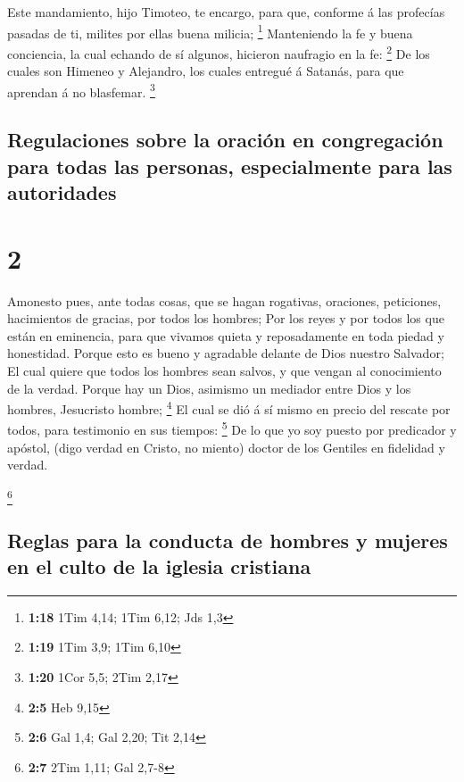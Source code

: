  Este mandamiento, hijo Timoteo, te encargo, para que,
conforme á las profecías pasadas de ti, milites por ellas buena milicia;
\footnote{\textbf{1:18} 1Tim 4,14; 1Tim 6,12; Jds 1,3} 
Manteniendo la fe y buena conciencia, la cual echando de sí algunos,
hicieron naufragio en la fe: \footnote{\textbf{1:19} 1Tim 3,9; 1Tim 6,10}
 De los cuales son Himeneo y Alejandro, los cuales entregué
á Satanás, para que aprendan á no blasfemar. \footnote{\textbf{1:20}
  1Cor 5,5; 2Tim 2,17}

\hypertarget{regulaciones-sobre-la-oraciuxf3n-en-congregaciuxf3n-para-todas-las-personas-especialmente-para-las-autoridades}{%
\subsection{Regulaciones sobre la oración en congregación para todas las
personas, especialmente para las
autoridades}\label{regulaciones-sobre-la-oraciuxf3n-en-congregaciuxf3n-para-todas-las-personas-especialmente-para-las-autoridades}}

\hypertarget{section-1}{%
\section{2}\label{section-1}}

 Amonesto pues, ante todas cosas, que se hagan rogativas,
oraciones, peticiones, hacimientos de gracias, por todos los hombres;
 Por los reyes y por todos los que están en eminencia, para
que vivamos quieta y reposadamente en toda piedad y honestidad.
 Porque esto es bueno y agradable delante de Dios nuestro
Salvador;  El cual quiere que todos los hombres sean salvos,
y que vengan al conocimiento de la verdad.  Porque hay un
Dios, asimismo un mediador entre Dios y los hombres, Jesucristo hombre;
\footnote{\textbf{2:5} Heb 9,15}  El cual se dió á sí mismo
en precio del rescate por todos, para testimonio en sus tiempos:
\footnote{\textbf{2:6} Gal 1,4; Gal 2,20; Tit 2,14}  De lo
que yo soy puesto por predicador y apóstol, (digo verdad en Cristo, no
miento) doctor de los Gentiles en fidelidad y verdad.

\footnote{\textbf{2:7} 2Tim 1,11; Gal 2,7-8}

\hypertarget{reglas-para-la-conducta-de-hombres-y-mujeres-en-el-culto-de-la-iglesia-cristiana}{%
\subsection{Reglas para la conducta de hombres y mujeres en el culto de
la iglesia
cristiana}\label{reglas-para-la-conducta-de-hombres-y-mujeres-en-el-culto-de-la-iglesia-cristiana}}

